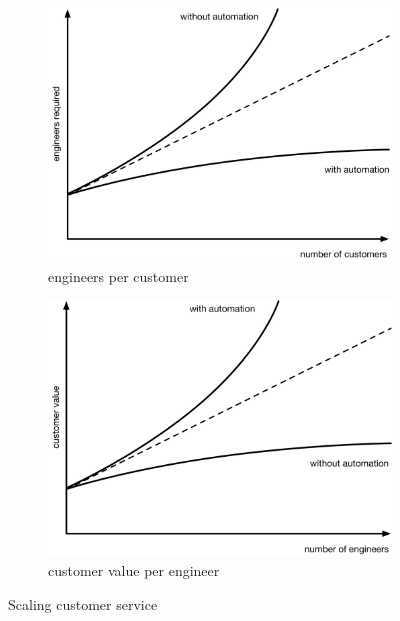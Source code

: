 \documentclass[reprint,amsmath,amssymb,aps]{revtex4-1}
\begin{document}
\begin{figure}[h]
	\begin{subfigure}{0.45\textwidth}
		\includegraphics[width=1\textwidth]{figs/scaling}
		\caption{engineers per customer}
		\label{fig:engineers-needed}
	\end{subfigure}
	\begin{subfigure}{0.45\textwidth}
		\includegraphics[width=1\textwidth]{figs/customervalue}
		\caption{customer value per engineer}
		\label{fig:value-engineer}
	\end{subfigure}
	\caption{Scaling customer service}
	\label{fig:scaling}
\end{figure}
\end{document}

